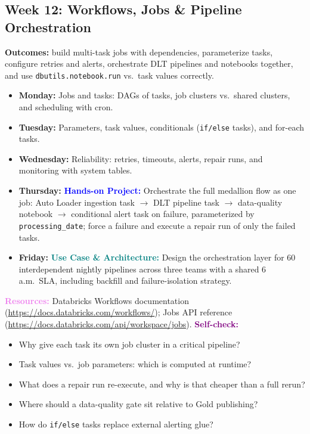 \documentclass[11pt, a4paper]{article}
\newcommand{\project}[1]{\vspace{1mm}\noindent\textbf{\textcolor{blue}{Hands-on Project:}} #1}
\newcommand{\usecase}[1]{\vspace{1mm}\noindent\textbf{\textcolor{teal}{Use Case \& Architecture:}} #1}
\newcommand{\dayitem}[2]{\item \textbf{#1:} #2}
\newcommand{\resources}[1]{\vspace{1mm}\noindent\textbf{\textcolor{violet}{Resources:}} #1}
\newcommand{\selfcheck}[1]{\vspace{1mm}\noindent\textbf{\textcolor{purple}{Self-check:}} #1}
\begin{document}
\subsection*{Week 12: Workflows, Jobs \& Pipeline Orchestration}
\par\noindent\textbf{Outcomes:} build multi-task jobs with dependencies, parameterize tasks, configure retries and alerts, orchestrate DLT pipelines and notebooks together, and use \texttt{dbutils.notebook.run} vs.\ task values correctly.
\begin{itemize}[label=-]
    \dayitem{Monday}{Jobs and tasks: DAGs of tasks, job clusters vs.\ shared clusters, and scheduling with cron.}
    \dayitem{Tuesday}{Parameters, task values, conditionals (\texttt{if/else} tasks), and for-each tasks.}
    \dayitem{Wednesday}{Reliability: retries, timeouts, alerts, repair runs, and monitoring with system tables.}
    \dayitem{Thursday}{\project{Orchestrate the full medallion flow as one job: Auto Loader ingestion task $\rightarrow$ DLT pipeline task $\rightarrow$ data-quality notebook $\rightarrow$ conditional alert task on failure, parameterized by \texttt{processing\_date}; force a failure and execute a repair run of only the failed tasks.}}
    \dayitem{Friday}{\usecase{Design the orchestration layer for 60 interdependent nightly pipelines across three teams with a shared 6 a.m.\ SLA, including backfill and failure-isolation strategy.}}
\end{itemize}
\resources{Databricks Workflows documentation (\url{https://docs.databricks.com/workflows/}); Jobs API reference (\url{https://docs.databricks.com/api/workspace/jobs}).}
\selfcheck{\begin{itemize}[label=-, leftmargin=1.5em, itemsep=0pt]
    \item Why give each task its own job cluster in a critical pipeline?
    \item Task values vs.\ job parameters: which is computed at runtime?
    \item What does a repair run re-execute, and why is that cheaper than a full rerun?
    \item Where should a data-quality gate sit relative to Gold publishing?
    \item How do \texttt{if/else} tasks replace external alerting glue?
\end{itemize}}
\end{document}
